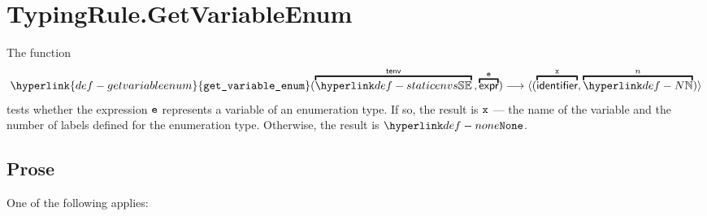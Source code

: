 \documentclass{book}
\newcommand\getvariableenum[0]{\hyperlink{def-getvariableenum}{\texttt{get\_variable\_enum}}}
\begin{document}
\section{TypingRule.GetVariableEnum \label{sec:TypingRule.GetVariableEnum}}
\hypertarget{def-getvariableenum}{}
The function
\[
\getvariableenum(\overname{\staticenvs}{\tenv} \aslsep \overname{\expr}{\ve}) \aslto
\langle (\overname{\identifier}{\vx}, \overname{\N}{n})\rangle
\]
tests whether the expression $\texttt{e}$ represents a variable of an enumeration type.
If so, the result is $\texttt{x}$ --- the name of the variable and the number of labels defined for the enumeration type.
Otherwise, the result is $\None$.

\subsection{Prose}
One of the following applies:
\end{document}
